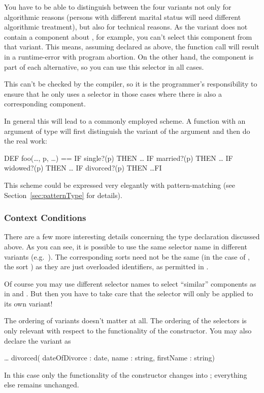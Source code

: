 You have to be able to distinguish between the four variants not only
for algorithmic reasons (persons with different marital status
will need different algorithmic treatment), but also for
technical reasons.
As the variant  does not contain a component about
, for example, you can't select this component from that
variant.
This means, assuming  declared as above, the function call
 will result in a runtime-error with program
abortion.
On the other hand, the component  is part of each
alternative, so you can use this selector in all cases.

This can't be checked by the compiler, so it is the programmer's
responsibility to ensure that he only uses a selector in those cases
where there is also a corresponding component.

In general this will lead to a commonly employed scheme. A function with an
argument of type  will first distinguish the variant of
the argument and then do the real work:
\begin{prog}
  DEF foo(\dots, p, \dots) ==
          IF single?(p) THEN \dots
          IF married?(p) THEN \dots
          IF widowed?(p) THEN \dots
          IF divorced?(p) THEN \dots FI
\end{prog}
This scheme could be expressed very elegantly with pattern-matching (see
Section~\ref{sec:patternType} for details).

\subsubsection{Context Conditions}
\advanced
There are a few more interesting details concerning the  type declaration
discussed above.
As you can see, it is possible to use the same selector name in 
different variants (e.g.~). 
 The corresponding sorts need not be  the same (in
the case of , the sort ) as they are just
overloaded identifiers, as permitted in \opal.

Of course you may use different selector names to select ``similar''
components as in  and .
But then you have to take care that the selector will only be applied
to its own variant!
 
\medskip
The ordering of variants doesn't matter at all.
 The ordering of the selectors is only relevant with respect to the
 functionality of the constructor.
You may also declare the variant  as
\begin{prog}
  \dots
  divorced( dateOfDivorce : date, name : string, firstName : string)
\end{prog}
In this case only the functionality of the constructor 
changes into ;
everything else remains unchanged.
\medskip

